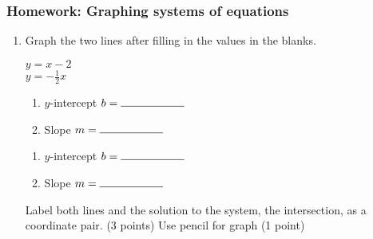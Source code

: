 \documentclass[12pt, twoside]{article}
\begin{document}
\subsubsection*{Homework: Graphing systems of equations}
\begin{enumerate}
    \item Graph the two lines after filling in the values in the blanks.\\[0.5cm]


    \begin{multicols}{2}
      $y= x -2$ \\
      $y=-\frac{1}{2} x $
    \end{multicols}
    \begin{multicols}{2}
      \raggedcolumns
      \begin{enumerate}
        \item $y$-intercept $b= \rule{2cm}{0.15mm}$ \\[0.5cm]
        \item Slope \hspace{0.7cm} $m= \rule{2cm}{0.15mm}$\\[0.5cm]
      \end{enumerate}
      \begin{enumerate}
        \item $y$-intercept $b= \rule{2cm}{0.15mm}$ \\[0.5cm]
        \item Slope \hspace{0.7cm} $m= \rule{2cm}{0.15mm}$\\[0.5cm]
      \end{enumerate}
    \end{multicols}

    Label both lines and the solution to the system, the intersection, as a coordinate pair. (3 points) Use pencil for graph (1 point)\\

    \begin{center} %
    \end{center}

\end{enumerate}
\newpage
\setcounter{page}{1}
\end{document}
